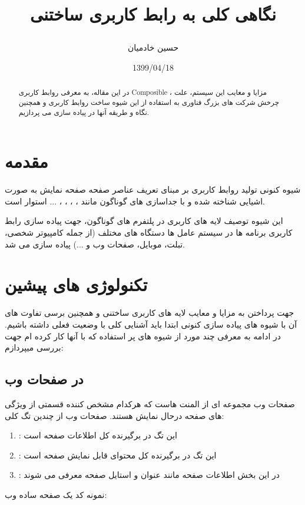 \documentclass{CSICC2020}
\title{
\lr{Overview on Composable UI}

نگاهی کلی به رابط کاربری ساختنی
}
\date{1399/04/18}
\author[1]{حسین خادمیان}
\affil[1]{
دانشجوی کارشناسی، مهندسی کامپیوتر، دانشگاه شیراز ، شیراز،
me@hkhademia.ir
}
\begin{document}
\maketitle
\begin{abstract}
در این مقاله، به معرفی روابط کاربری Composible ، مزایا و معایب این سیستم، علت چرخش شرکت های بزرگ فناوری به استفاده از این شیوه ساخت روابط کاربری و همچنین نگاه و طریقه آنها در پیاده سازی می پردازیم.
 \end{abstract}
\begin{keywords}
\end{keywords}

\section{مقدمه}
شیوه کنونی تولید روابط کاربری بر مبنای تعریف عناصر صفحه صفحه نمایش به صورت اشیایی شناخته شده و با جداسازی  های گوناگون مانند ، ، ، ، ... استوار است.

این شیوه توصیف لایه های کاربری در پلتفرم های گوناگون، جهت پیاده سازی رابط کاربری برنامه ها در سیستم عامل ها دستگاه های مختلف (از جمله کامپیوتر شخصی، تبلت، موبایل، صفحات وب و ...) پیاده سازی می شد.


\section{تکنولوژی های پیشین}
جهت پرداختن به مزایا و معایب لایه های کاربری ساختنی و همچنین برسی تفاوت های آن با شیوه های پیاده سازی کنونی ابتدا باید آشنایی کلی با وضعیت فعلی داشته باشیم.
در ادامه به معرفی چند مورد از شیوه های پر استفاده که با آنها کار کرده ام جهت بررسی میپردازم:

\subsection{ در صفحات وب}

صفحات وب مجموعه ای از المنت هاست
که هرکدام مشخص کننده قسمتی از ویژگی های صفحه درحال نمایش هستند. صفحات وب از چندین تگ کلی:
\begin{enumerate} 
\item {}: این تگ در برگیرنده کل اطلاعات صفحه است
\item {}: این تگ در برگیرنده کل محتوای قابل نمایش صفحه است
\item {}: در این بخش اطلاعات صفحه مانند عنوان و استایل صفحه معرفی می شوند
\end{enumerate} 
نمونه کد یک صفحه ساده وب:
\end{document}

